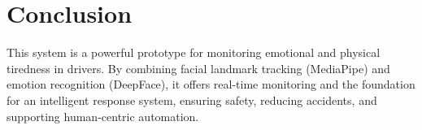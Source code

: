 \documentclass[12pt]{article}
\begin{document}
\section{Conclusion}
This system is a powerful prototype for monitoring emotional and physical tiredness in drivers. By combining facial landmark tracking (MediaPipe) and emotion recognition (DeepFace), it offers real-time monitoring and the foundation for an intelligent response system, ensuring safety, reducing accidents, and supporting human-centric automation.
\end{document}
